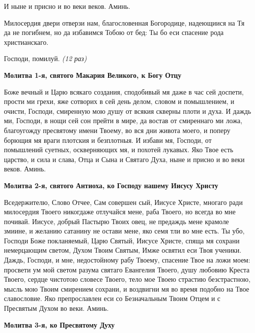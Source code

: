    И ныне и присно и во веки веков. Аминь.



   Милосердия двери отверзи нам, благословенная Богородице, надеющиися
на Тя да не погибнем, но да избавимся Тобою от бед: Ты бо еси спасение
рода христианскаго.




   Господи, помилуй. \itshape  (12 раз)\normalfont{}



 

\bfseries Молитва 1-я, святого Макария Великого, к Богу Отцу\normalfont{}


   Боже вечный и Царю всякаго создания, сподобивый мя даже в час сей
доспети, прости ми грехи, яже сотворих в сей день делом, словом и
помышлением, и очисти, Господи, смиренную мою душу от всякия
скверны плоти и духа. И даждь ми, Господи, в нощи сей сон прейти в
мире, да востав от смиреннаго ми ложа, благоугожду пресвятому
имени Твоему, во вся дни живота моего, и поперу борющия мя враги
плотския и безплотныя. И избави мя, Господи, от помышлений суетных,
оскверняющих мя, и похотей лукавых. Яко Твое есть царство, и сила и
слава, Отца и Сына и Святаго Духа, ныне и присно и во веки веков.
Аминь.



 

\bfseries Молитва 2-я, святого Антиоха, ко Господу нашему Иисусу Христу\normalfont{}


   Вседержителю, Слово Отчее, Сам совершен сый, Иисусе Христе, многаго
ради милосердия Твоего никогдаже отлучайся мене, раба Твоего,
но всегда во мне почивай. Иисусе, добрый Пастырю Твоих овец, не
предаждь мене крамоле змиине, и желанию сатанину не остави мене, яко
семя тли во мне есть. Ты убо, Господи Боже покланяемый, Царю
Святый, Иисусе Христе, спяща мя сохрани немерцающим светом,
Духом Твоим Святым, Имже освятил еси Твоя ученики. Даждь,
Господи, и мне, недостойному рабу Твоему, спасение Твое на ложи
моем: просвети ум мой светом разума святаго Евангелия Твоего, душу
любовию Креста Твоего, сердце чистотою словесе Твоего, тело мое Твоею
страстию безстрастною, мысль мою Твоим смирением сохрани, и
воздвигни мя во время подобно на Твое славословие. Яко препрославлен
еси со Безначальным Твоим Отцем и с Пресвятым Духом во веки.
Аминь.



 

\bfseries Молитва 3-я, ко Пресвятому Духу\normalfont{}


